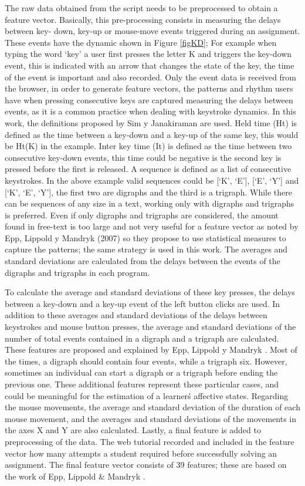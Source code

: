 \documentclass[a4paper,twoside]{article}
\begin{document}
The raw data obtained from the script needs to be preprocessed to obtain a feature vector.
Basically, this pre-processing consists in measuring the delays between key-
down, key-up or mouse-move events triggered during an assignment.
These events have the dynamic shown in Figure \ref{figKD};
For example when typing the word ‘key’ a
user first presses the letter K and triggers the key-down event, this is
indicated with an arrow that changes the state of the key, the time of the event
is important and also recorded. Only the event data is received from the
browser, in order to generate feature vectors, the patterns and rhythm users
have when pressing consecutive keys are captured measuring the delays between
events, as it is a common practice when dealing with keystroke dynamics. In this
work, the definitions proposed by Sim y Janakiraman \cite{sim2007digraphs} are used. Held
time (Ht) is defined as the time between a key-down and a key-up of the same
key, this would be Ht(K) in the example. Inter key time (It) is defined as the
time between two consecutive key-down events, this time could be negative is the
second key is pressed before the first is released. A sequence is defined as a
list of consecutive keystrokes. In the above example valid sequences could be
[‘K’, ‘E’], [‘E’, ‘Y’] and [‘K’, ‘E’, ‘Y’], the first two are digraphs and the
third is a trigraph. While there can be sequences of any size in a text, working
only with digraphs and trigraphs is preferred. Even if only digraphs and
trigraphs are considered, the amount found in free-text is too large and not
very useful for a feature vector as noted by Epp, Lippold y Mandryk (2007) so
they propose to use statistical measures to capture the patterns; the same
strategy is used in this work. The averages and standard deviations are
calculated from the delays between the events of the digraphs and trigraphs in
each program.


To calculate the average and standard deviations of these key presses, the delays
between a key-down and a key-up event of the left button clicks are used. In
addition to these averages and standard deviations of the delays between
keystrokes and mouse button presses, the average and standard deviations of the
number of total events contained in a digraph and a trigraph are calculated.
These features are proposed and explained by Epp, Lippold y Mandryk \cite{epp2011identifying}. Most
of the times, a digraph should contain four events, while a trigraph six.
However, sometimes an individual can start a digraph or a trigraph before ending
the previous one. These additional features represent these particular cases,
and could be meaningful for the estimation of a learner\'s affective states.
Regarding the mouse movements, the average and standard deviation of the
duration of each mouse movement, and the averages and standard deviations of the
movements in the axes X and Y are also calculated. Lastly, a final feature is
added to preprocessing of the data. The web tutorial recorded  and included in the feature vector how many attempts
a student required before successfully solving an assignment. The final feature vector
consists of 39 features; these are based on the work of Epp, Lippold \& Mandryk
\cite{epp2011identifying}.
\end{document}
